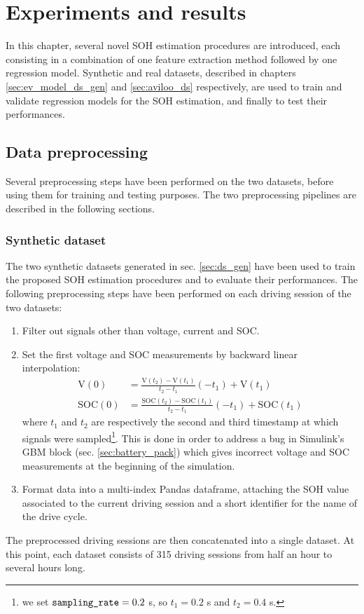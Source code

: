 \chapter{Experiments and results}
\label{sec:experiments}

In this chapter, several novel SOH estimation procedures are introduced, each consisting in a combination of one feature extraction method followed by one regression model. Synthetic and real datasets, described in chapters \ref{sec:ev_model_ds_gen} and \ref{sec:aviloo_ds} respectively, are used to train and validate regression models for the SOH estimation, and finally to test their performances.

\section{Data preprocessing}
\label{sec:ds_preprocessing}
Several preprocessing steps have been performed on the two datasets, before using them for training and testing purposes. The two preprocessing pipelines are described in the following sections.

\subsection{Synthetic dataset}
\label{sec:synth_preprocessing}
The two synthetic datasets generated in sec. \ref{sec:ds_gen} have been used to train the proposed SOH estimation procedures and to evaluate their performances. The following preprocessing steps have been performed on each driving session of the two datasets:
\begin{enumerate}
    \item Filter out signals other than voltage, current and SOC.
    \item Set the first voltage and SOC measurements by backward linear interpolation:
    \begin{align}
        \text{V}(0) &= \frac{\text{V}(t_2)-\text{V}(t_1)}{t_2-t_1}(-t_1)+\text{V}(t_1)\\
        \text{SOC}(0) &= \frac{\text{SOC}(t_2)-\text{SOC}(t_1)}{t_2-t_1}(-t_1)+\text{SOC}(t_1)
    \end{align}
    where $t_1$ and $t_2$ are respectively the second and third timestamp at which signals were sampled\footnote{we set $\text{\texttt{sampling\_rate}} = 0.2$ s, so $t_1=0.2$ s and $t_2=0.4$ s.\label{note:sampling_rate}}. This is done in order to address a bug in Simulink's GBM block (sec. \ref{sec:battery_pack}) which gives incorrect voltage and SOC measurements at the beginning of the simulation.
    \item Format data into a multi-index Pandas dataframe, attaching the SOH value associated to the current driving session and a short identifier for the name of the drive cycle.
\end{enumerate}
The preprocessed driving sessions are then concatenated into a single dataset. At this point, each dataset consists of 315 driving sessions from half an hour to several hours long.

